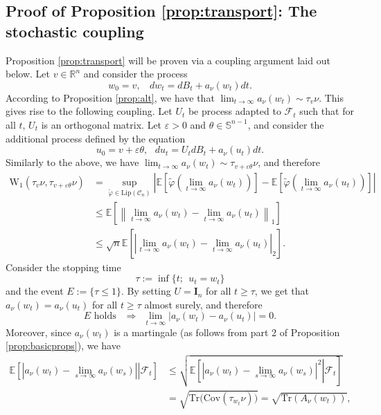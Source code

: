 \documentclass[12pt]{article}
\def \Sph{\mathbb{S}^{n-1}}
\def \RR {\mathbb R}
\def \EE {\mathbb E}
\def \eps {\varepsilon}
\def \DC {\mathcal{C}_n}
\def \Id {\mathbf{I}_n}
\def \COV {\mathrm{Cov}}
\def \FF {\mathcal{F}}
\theoremstyle{definition}
\theoremstyle{remark}
\begin{document}
\subsection{Proof of Proposition \ref{prop:transport}: The stochastic coupling}
Proposition \ref{prop:transport} will be proven via a coupling argument laid out below. Let $v \in \RR^n$ and consider the process
\begin{equation}\label{eq:dvtc}
w_0 = v, ~~~~ d w_t = d B_t + a_\nu(w_t) dt.
\end{equation}
According to Proposition \ref{prop:alt}, we have that $\lim_{t \to \infty} a_\nu(w_t) \sim \tau_{v} \nu$. This gives rise to the following coupling. Let $U_t$ be process adapted to $\FF_t$ such that for all $t$, $U_t$ is an orthogonal matrix. Let $\eps > 0$ and $\theta \in \Sph$, and consider the additional process defined by the equation
\begin{equation}\label{eq:dutc}
u_0 = v + \eps \theta, ~~~ d u_t = U_t d B_t + a_\nu(u_t) dt.
\end{equation}
Similarly to the above, we have $\lim_{t \to \infty} a_\nu(w_t) \sim \tau_{v + \eps \theta} \nu$, and therefore
\begin{align*}
\mathrm{W}_1(\tau_v \nu, \tau_{v + \eps \theta} \nu) & = \sup_{\tilde \varphi \in \mathrm{Lip}(\DC)} \left  |\EE \left [ \tilde \varphi \left ( \lim_{t \to \infty} a_\nu(w_t) \right ) \right ] - \EE \left [ \tilde \varphi \left ( \lim_{t \to \infty} a_\nu(u_t) \right ) \right ] \right  | \nonumber \\
& \leq  \EE \left  [ \left \| \lim_{t \to \infty} a_\nu(w_t) - \lim_{t \to \infty} a_\nu(u_t) \right  \|_1 \right ] \nonumber \\
& \leq \sqrt{n} \EE \left  [ \left | \lim_{t \to \infty} a_\nu(w_t) - \lim_{t \to \infty} a_\nu(u_t) \right  |_2 \right ].
\end{align*}
Consider the stopping time
$$
\tau := \inf\{t; ~~ u_t = w_t\}
$$  
and the event $E := \{\tau \leq 1\}$. By setting $U = \Id$ for all $t \geq \tau$, we get that $a_\nu(w_t) = a_\nu(u_t)$ for all $t \geq \tau$ almost surely, and therefore
$$
E \mbox{ holds } ~~ \Rightarrow ~~ \lim_{t \to \infty} |a_\nu(w_t)- a_\nu(u_t)| = 0.
$$
Moreover, since $a_\nu(w_t)$ is a martingale (as follows from part 2 of Proposition \ref{prop:basicprops}), we have
\begin{align*}
\left . \EE \left [ \left | a_\nu(w_t) - \lim_{s \to \infty} a_\nu(w_s) \right  | \right  | \FF_t \right ] & \leq \sqrt{ \EE \left . \left [ \left  | a_\nu(w_t) - \lim_{s \to \infty} a_\nu(w_s) \right  |^2 \right | \FF_t \right ]} \\
& = \sqrt{\mathrm{Tr}\bigl (\COV(\tau_{w_t} \nu ) \bigr)} = \sqrt{\mathrm{Tr}(A_\nu(w_t))},
\end{align*}
\end{document}
